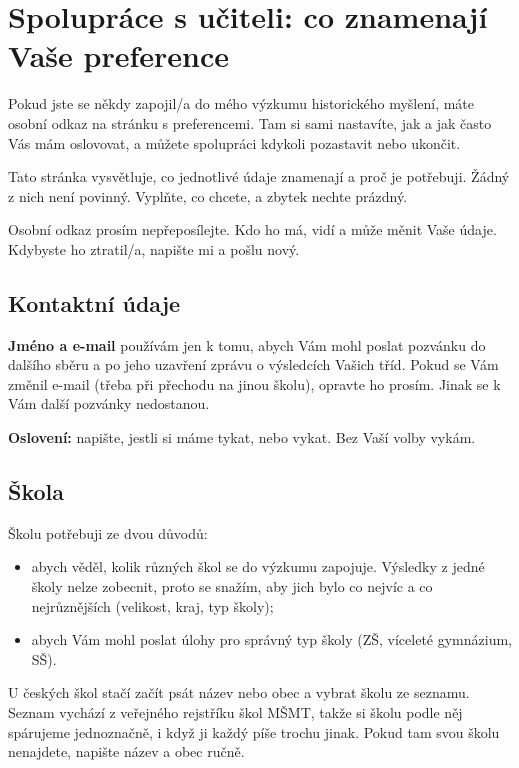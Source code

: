 \documentclass[
  12pt,
  english,
  a4paper,
  extrafontsizes,onecolumn,openright
  ]{memoir}
\providecommand{\tightlist}{%
  \setlength{\itemsep}{0pt}\setlength{\parskip}{0pt}}
\begin{document}
\chapter{Spolupráce s učiteli: co znamenají Vaše preference}\label{spoluprace}

Pokud jste se někdy zapojil/a do mého výzkumu historického myšlení,
máte osobní odkaz na stránku s preferencemi. Tam si sami nastavíte, jak
a jak často Vás mám oslovovat, a můžete spolupráci kdykoli pozastavit
nebo ukončit.

Tato stránka vysvětluje, co jednotlivé údaje znamenají a proč je
potřebuji. Žádný z nich není povinný. Vyplňte, co chcete, a zbytek
nechte prázdný.

Osobní odkaz prosím nepřeposílejte. Kdo ho má, vidí a může měnit Vaše
údaje. Kdybyste ho ztratil/a, napište mi a pošlu nový.

\section{Kontaktní údaje}\label{spoluprace-kontakt}

\textbf{Jméno a e-mail} používám jen k tomu, abych Vám mohl poslat pozvánku
do dalšího sběru a po jeho uzavření zprávu o výsledcích Vašich tříd.
Pokud se Vám změnil e-mail (třeba při přechodu na jinou školu), opravte
ho prosím. Jinak se k Vám další pozvánky nedostanou.

\textbf{Oslovení:} napište, jestli si máme tykat, nebo vykat. Bez Vaší volby
vykám.

\section{Škola}\label{spoluprace-skola}

Školu potřebuji ze dvou důvodů:

\begin{itemize}
\tightlist
\item
  abych věděl, kolik různých škol se do výzkumu zapojuje. Výsledky z
  jedné školy nelze zobecnit, proto se snažím, aby jich bylo co nejvíc
  a co nejrůznějších (velikost, kraj, typ školy);
\item
  abych Vám mohl poslat úlohy pro správný typ školy (ZŠ, víceleté
  gymnázium, SŠ).
\end{itemize}

U českých škol stačí začít psát název nebo obec a vybrat školu ze
seznamu. Seznam vychází z veřejného rejstříku škol MŠMT, takže si
školu podle něj spárujeme jednoznačně, i když ji každý píše trochu
jinak. Pokud tam svou školu nenajdete, napište název a obec ručně.
\end{document}
